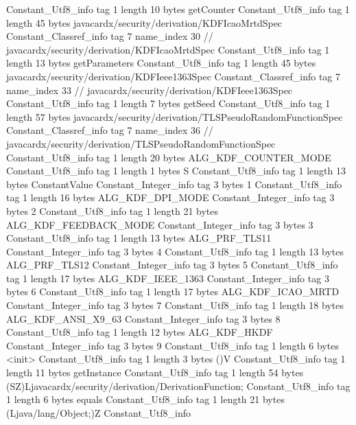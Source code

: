 {{{		}
		Constant_Utf8_info {
			tag	1
			length	10
			bytes	getCounter
		}
		Constant_Utf8_info {
			tag	1
			length	45
			bytes	javacardx/security/derivation/KDFIcaoMrtdSpec
		}
		Constant_Classref_info {
			tag	7
			name_index	30		// javacardx/security/derivation/KDFIcaoMrtdSpec
		}
		Constant_Utf8_info {
			tag	1
			length	13
			bytes	getParameters
		}
		Constant_Utf8_info {
			tag	1
			length	45
			bytes	javacardx/security/derivation/KDFIeee1363Spec
		}
		Constant_Classref_info {
			tag	7
			name_index	33		// javacardx/security/derivation/KDFIeee1363Spec
		}
		Constant_Utf8_info {
			tag	1
			length	7
			bytes	getSeed
		}
		Constant_Utf8_info {
			tag	1
			length	57
			bytes	javacardx/security/derivation/TLSPseudoRandomFunctionSpec
		}
		Constant_Classref_info {
			tag	7
			name_index	36		// javacardx/security/derivation/TLSPseudoRandomFunctionSpec
		}
		Constant_Utf8_info {
			tag	1
			length	20
			bytes	ALG_KDF_COUNTER_MODE
		}
		Constant_Utf8_info {
			tag	1
			length	1
			bytes	S
		}
		Constant_Utf8_info {
			tag	1
			length	13
			bytes	ConstantValue
		}
		Constant_Integer_info {
			tag	3
			bytes	1
		}
		Constant_Utf8_info {
			tag	1
			length	16
			bytes	ALG_KDF_DPI_MODE
		}
		Constant_Integer_info {
			tag	3
			bytes	2
		}
		Constant_Utf8_info {
			tag	1
			length	21
			bytes	ALG_KDF_FEEDBACK_MODE
		}
		Constant_Integer_info {
			tag	3
			bytes	3
		}
		Constant_Utf8_info {
			tag	1
			length	13
			bytes	ALG_PRF_TLS11
		}
		Constant_Integer_info {
			tag	3
			bytes	4
		}
		Constant_Utf8_info {
			tag	1
			length	13
			bytes	ALG_PRF_TLS12
		}
		Constant_Integer_info {
			tag	3
			bytes	5
		}
		Constant_Utf8_info {
			tag	1
			length	17
			bytes	ALG_KDF_IEEE_1363
		}
		Constant_Integer_info {
			tag	3
			bytes	6
		}
		Constant_Utf8_info {
			tag	1
			length	17
			bytes	ALG_KDF_ICAO_MRTD
		}
		Constant_Integer_info {
			tag	3
			bytes	7
		}
		Constant_Utf8_info {
			tag	1
			length	18
			bytes	ALG_KDF_ANSI_X9_63
		}
		Constant_Integer_info {
			tag	3
			bytes	8
		}
		Constant_Utf8_info {
			tag	1
			length	12
			bytes	ALG_KDF_HKDF
		}
		Constant_Integer_info {
			tag	3
			bytes	9
		}
		Constant_Utf8_info {
			tag	1
			length	6
			bytes	<init>
		}
		Constant_Utf8_info {
			tag	1
			length	3
			bytes	()V
		}
		Constant_Utf8_info {
			tag	1
			length	11
			bytes	getInstance
		}
		Constant_Utf8_info {
			tag	1
			length	54
			bytes	(SZ)Ljavacardx/security/derivation/DerivationFunction;
		}
		Constant_Utf8_info {
			tag	1
			length	6
			bytes	equals
		}
		Constant_Utf8_info {
			tag	1
			length	21
			bytes	(Ljava/lang/Object;)Z
		}
		Constant_Utf8_info {
}}}
